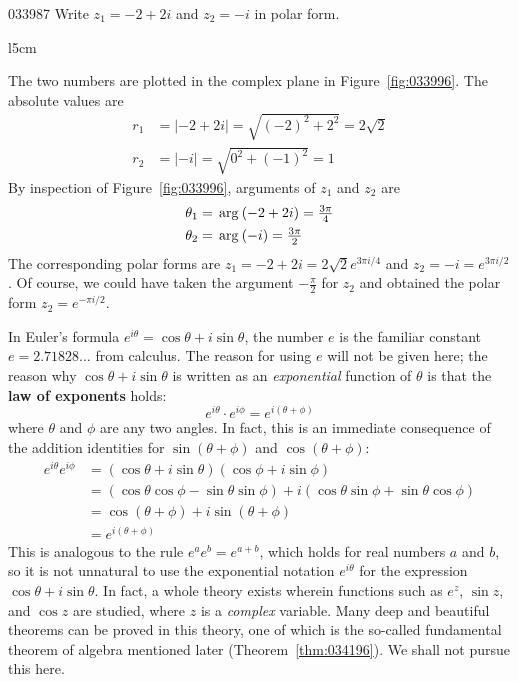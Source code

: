 \begin{example}{}{033987}
Write $z_{1} = -2 + 2i$ and $z_{2} = -i$ in polar form.


\begin{solution}
\begin{wrapfigure}[7]{l}{5cm}
	\centering
	
	\caption{\label{fig:033996}}	
\end{wrapfigure}

\setlength{\rightskip}{0pt plus 200pt}
The two numbers are plotted in the complex plane in Figure~\ref{fig:033996}. The absolute values are
\begin{align*}
r_1 &= |-2 + 2i| = \sqrt{(-2)^2 + 2^2} = 2\sqrt{2}\\
r_2 &= |-i| = \sqrt{0^2 + (-1)^2} = 1
\end{align*}
By inspection of Figure~\ref{fig:033996}, arguments of $z_{1}$ and $z_{2}$ are
\begin{align*}
\theta_1 &= \thinspace\operatorname{arg\medspace}(-2+2i) = \tfrac{3\pi}{4}\\
\theta_2 &= \thinspace\operatorname{arg\medspace}(-i) = \tfrac{3\pi}{2}
\end{align*}
The corresponding polar forms are $z_{1} = -2 + 2i = 2\sqrt{2} e^{3\pi i/4}$
 and $z_{2} = -i = e^{3\pi i/2}$. Of course, we could have taken the argument $-\frac{\pi}{2}$ for $z_{2}$ and obtained the polar form $z_{2} = e^{-\pi i/2}$.
\end{solution}
\end{example}

In Euler's formula $e^{i\theta}= \cos \theta + i \sin \theta$, the number $e$ is the familiar constant $e = 2.71828\dots$  from calculus. The reason for using $e$ will not be given here; the reason why $\cos \theta + i \sin \theta$ is written as an \textit{exponential} function of $\theta$ is that the \textbf{law of exponents} holds:
\begin{equation*}
e^{i\theta} \cdot e^{i\phi} = e^{i (\theta + \phi)}
\end{equation*}
where $\theta$ and $\phi$ are any two angles. In fact, this is an immediate consequence of the addition identities for $\sin(\theta + \phi)$ and $\cos(\theta + \phi)$:
\newpage
\begin{align*}
e^{i\theta} e^{i\phi} &= (\cos \theta + i \sin \theta) (\cos \phi + i \sin \phi) \\
&= (\cos \theta \cos \phi - \sin \theta \sin \phi) + i (\cos \theta \sin \phi + \sin \theta \cos \phi) \\
&= \cos (\theta +  \phi) +i \sin (\theta + \phi) \\
& =e^{i (\theta + \phi)}
\end{align*}
This is analogous to the rule $e^{a}e^{b} = e^{a+b}$, which holds for real numbers $a$ and $b$, so it is not unnatural to use the exponential notation $e^{i\theta}$ for the expression $\cos \theta + i \sin \theta$. In fact, a whole theory exists wherein functions such as $e^{z}$, $\sin z$, and $\cos z$ are studied, where $z$ is a \textit{complex}
 variable. Many deep and beautiful theorems can be proved in this 
theory, one of which is the so-called fundamental theorem of algebra 
mentioned later (Theorem~\ref{thm:034196}). We shall not pursue this here.


